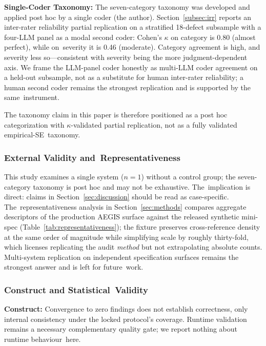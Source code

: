 \documentclass[software,article,accept,pdftex,oneauthor]{Definitions/mdpi}
\begin{document}
\textbf{Single-Coder Taxonomy:} The seven-category taxonomy was developed and applied post hoc by a single coder (the author). Section~\ref{subsec:irr} reports an inter-rater reliability partial replication on a stratified 18-defect subsample with a four-LLM panel as a modal second coder: Cohen's $\kappa$ on category is 0.80 (almost perfect), while on~severity it is 0.46 (moderate). Category agreement is high, and severity less so---consistent with severity being the more judgment-dependent axis. We frame the LLM-panel coder honestly as multi-LLM coder agreement on a held-out subsample, not as a substitute for human inter-rater reliability; a human second coder remains the strongest replication and is supported by the same~instrument.

The taxonomy claim in this paper is therefore positioned as a post hoc categorization with $\kappa$-validated partial replication, not as a fully validated empirical-SE~taxonomy.

\subsubsection{External Validity and~Representativeness}

This study examines a single system ($n = 1$) without a control group; the seven-category taxonomy is post hoc and may not be exhaustive. The~implication is direct: claims in Section~\ref{sec:discussion} should be read as case-specific. The~representativeness analysis in Section~\ref{sec:methods} compares aggregate descriptors of the production AEGIS surface against the released synthetic mini-spec (Table~\ref{tab:representativeness}); the fixture preserves cross-reference density at the same order of magnitude while simplifying scale by roughly thirty-fold, which licenses replicating the audit \emph{method} but not extrapolating absolute counts. Multi-system replication on independent specification surfaces remains the strongest answer and is left for future~work.

\subsubsection{Construct and Statistical~Validity}
\label{subsec:statistical}

\textbf{Construct:} Convergence to zero findings does not establish correctness, only internal consistency under the locked protocol's coverage. Runtime validation remains a necessary complementary quality gate; we report nothing about runtime behaviour~here.
\end{document}
